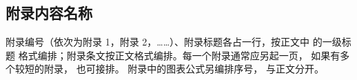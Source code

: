 %
%
%
%

\begin{appendices}
  \chapter{附录内容名称}
  附录编号（依次为附录 1，附录 2，……）、附录标题各占一行，按正文中
  的一级标题 格式编排；附录条文按正文格式编排。每一个附录通常应另起一页，
  如果有多个较短的附录， 也可接排。 附录中的图表公式另编排序号， 与正文分开。
\end{appendices}
